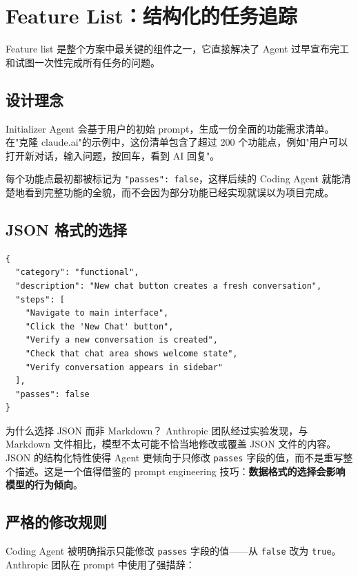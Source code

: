 \section{Feature List：结构化的任务追踪}

Feature list 是整个方案中最关键的组件之一，它直接解决了 Agent 过早宣布完工和试图一次性完成所有任务的问题。

\subsection{设计理念}

Initializer Agent 会基于用户的初始 prompt，生成一份全面的功能需求清单。在"克隆 claude.ai"的示例中，这份清单包含了超过 200 个功能点，例如"用户可以打开新对话，输入问题，按回车，看到 AI 回复"。

每个功能点最初都被标记为 \texttt{"passes": false}，这样后续的 Coding Agent 就能清楚地看到完整功能的全貌，而不会因为部分功能已经实现就误以为项目完成。

\subsection{JSON 格式的选择}

\begin{lstlisting}[language={}, caption={Feature list 中单个功能的 JSON 结构}]
{
  "category": "functional",
  "description": "New chat button creates a fresh conversation",
  "steps": [
    "Navigate to main interface",
    "Click the 'New Chat' button",
    "Verify a new conversation is created",
    "Check that chat area shows welcome state",
    "Verify conversation appears in sidebar"
  ],
  "passes": false
}
\end{lstlisting}

\begin{importantbox}{为什么选择 JSON 而非 Markdown？}
Anthropic 团队经过实验发现，与 Markdown 文件相比，模型不太可能不恰当地修改或覆盖 JSON 文件的内容。JSON 的结构化特性使得 Agent 更倾向于只修改 \texttt{passes} 字段的值，而不是重写整个描述。这是一个值得借鉴的 prompt engineering 技巧：\textbf{数据格式的选择会影响模型的行为倾向}。
\end{importantbox}

\subsection{严格的修改规则}

Coding Agent 被明确指示只能修改 \texttt{passes} 字段的值——从 \texttt{false} 改为 \texttt{true}。Anthropic 团队在 prompt 中使用了强措辞：

